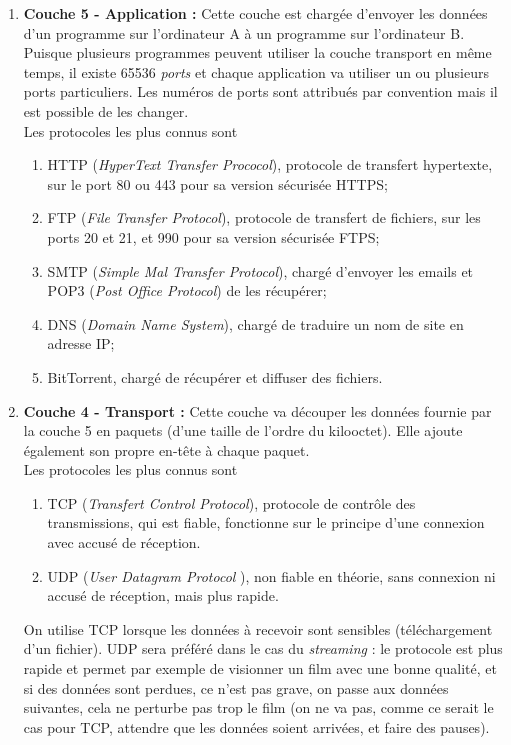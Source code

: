 \documentclass[a4paper,12pt]{book}
\begin{document}
\begin{enumerate}[]
	\item 	\textbf{Couche 5 - Application :} Cette couche est chargée d'envoyer les données d'un programme sur l'ordinateur A à un programme sur l'ordinateur B. Puisque plusieurs programmes peuvent utiliser la couche transport en même temps, il existe 65536 \textit{ports} et chaque application va utiliser un ou plusieurs ports particuliers. Les numéros de ports sont attribués par convention mais il est possible de les changer.\\
	Les protocoles les plus connus sont 
	\begin{enumerate}[--]
		\item 	HTTP (\textit{HyperText Transfer Prococol}), protocole de transfert hypertexte, sur le port 80 ou 443 pour sa version sécurisée HTTPS;
		\item 	FTP (\textit{File Transfer Protocol}), protocole de transfert de fichiers, sur les ports 20 et 21, et 990 pour sa version sécurisée FTPS;
		\item 	SMTP (\textit{Simple Mal Transfer Protocol}), chargé d'envoyer les emails et POP3 (\textit{Post Office Protocol}) de les récupérer;
		\item 	DNS (\textit{Domain Name System}), chargé de traduire un nom de site en adresse IP;
		\item 	BitTorrent, chargé de récupérer et diffuser des fichiers.
	\end{enumerate}


	\item 	\textbf{Couche 4 - Transport :} Cette couche va découper les données fournie par la couche 5 en paquets (d'une taille de l'ordre du kilooctet). Elle ajoute également son propre en-tête à chaque paquet.\\
	Les protocoles les plus connus sont
	\begin{enumerate}[--]
			\item 	TCP (\textit{Transfert Control Protocol}), protocole de contrôle des transmissions, qui est fiable, fonctionne sur le principe d'une connexion avec accusé de réception.
			\item 	UDP (\textit{User Datagram Protocol} ), non fiable en théorie, sans connexion ni accusé de réception, mais plus rapide.
		\end{enumerate}
	On utilise TCP lorsque les données à recevoir sont sensibles (téléchargement d'un fichier). UDP sera préféré dans le cas du \textit{streaming} : le protocole est plus rapide et permet par exemple de visionner un film avec une bonne qualité, et si des données sont perdues, ce n'est pas grave, on passe aux données suivantes, cela ne perturbe pas trop le film (on ne va pas, comme ce serait le cas pour TCP, attendre que les données soient arrivées, et faire des pauses).


\end{enumerate}
\end{document}
